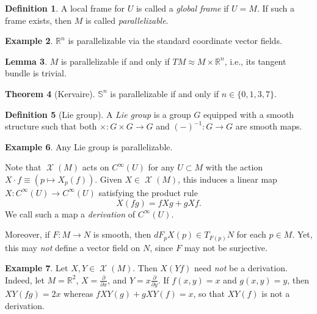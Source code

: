 \documentclass[10pt,letterpaper,cm]{nupset}
\theoremstyle{definition}
\newtheorem{definition}{Definition}[subsection]
\newtheorem{exmp}[definition]{Example}
\theoremstyle{theorem}
\newtheorem{theorem}[definition]{Theorem}
\newtheorem{lemma}[definition]{Lemma}
\theoremstyle{remark}
\newcommand{\R}{\mathbb R}
\renewcommand{\S}{\mathbb S}
\newcommand{\1}{\mathbf{1}}
\newcommand{\0}{\vec 0}
\DeclareMathOperator{\vf}{\mathscr{X}}
\begin{document}
\begin{definition}
A  local frame for $U$ is called a \textit{global frame} if $U =M$. If such a frame exists, then $M$ is called \textit{parallelizable}.
\end{definition}

\begin{exmp}
$\R^n$ is parallelizable via the standard coordinate vector fields.
\end{exmp}

\begin{lemma}
$M$ is parallelizable if and only if $TM \approx M \times \R^n$, i.e., its tangent bundle is trivial.
\end{lemma}

\begin{theorem}[Kervaire]
$\S^n$ is parallelizable if and only if $n\in \{0, 1, 3, 7\}$.
\end{theorem}

\begin{definition}[Lie group]
A  \textit{Lie group} is a group $G$ equipped with a smooth structure such that both $\times : G \times G \to G$ and $({-})^{-1} : G \to G$ are smooth maps.
\end{definition}

\begin{exmp}
Any Lie group is parallelizable. 
\end{exmp}

\medskip

Note that $\vf(M)$ acts on $C^{\infty}(U)$ for any $U \subset M$ with the action $X \cdot f \equiv \left(p \mapsto X_p(f)\right)$. Given $X \in \vf(M)$, this induces a linear map $X : C^{\infty}(U) \to C^{\infty}(U)$ satisfying the product rule $$X(fg) = fXg  + gXf.$$ We call such a map a \textit{derivation} of $C^{\infty}(U)$.

\medskip

 Moreover, if $F: M \to N$ is smooth, then $dF_pX(p) \in T_{F(p)}N$ for each $p \in M$. Yet, this may \emph{not} define a vector field on $N$, since $F$ may not be surjective.


\begin{exmp}
Let $X, Y \in \vf(M)$. Then $X(Yf)$ need \emph{not} be a derivation. Indeed, let $M= \R^2$, $X= \frac{\partial}{\partial{x}}$, and $Y = x \frac{\partial}{\partial{y}}$. If $f(x,y)=x$ and $g(x, y) = y$, then $XY(fg) = 2x$ whereas $fXY(g) + gXY(f) = x$, so that $XY(f)$ is not a derivation.
\end{exmp}
\end{document}
